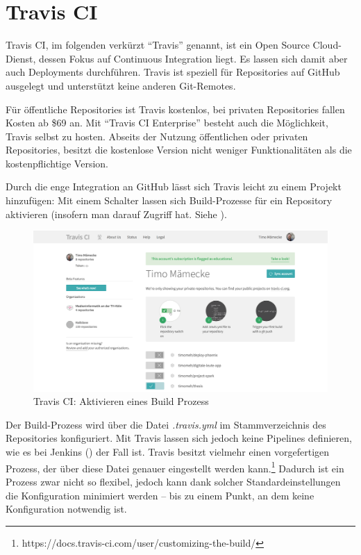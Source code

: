 \section{Travis CI}
\label{sec:analyse-travis}

Travis CI, im folgenden verkürzt ``Travis'' genannt, ist ein Open Source Cloud-Dienst, dessen Fokus auf Continuous Integration liegt. Es lassen sich damit aber auch Deployments durchführen. Travis ist speziell für Repositories auf GitHub ausgelegt und unterstützt keine anderen Git-Remotes.

Für öffentliche Repositories ist Travis kostenlos, bei privaten Repositories fallen Kosten ab \$69 an. Mit ``Travis CI Enterprise'' besteht auch die Möglichkeit, Travis selbst zu hosten. Abseits der Nutzung öffentlichen oder privaten Repositories, besitzt die kostenlose Version nicht weniger Funktionalitäten als die kostenpflichtige Version.

Durch die enge Integration an GitHub lässt sich Travis leicht zu einem Projekt hinzufügen: Mit einem Schalter lassen sich Build-Prozesse für ein Repository aktivieren (insofern man darauf Zugriff hat. Siehe ).

\begin{figure}[h]
  \caption{Travis CI: Aktivieren eines Build Prozess}
  \label{fig:travis-active}
  \includegraphics[width=.8\textwidth]{assets/travis-activate}
\end{figure}

Der Build-Prozess wird über die Datei \emph{.travis.yml} im Stammverzeichnis des Repositories konfiguriert. Mit Travis lassen sich jedoch keine Pipelines definieren, wie es bei Jenkins () der Fall ist. Travis besitzt vielmehr einen vorgefertigen Prozess, der über diese Datei genauer eingestellt werden kann.\footnote{https://docs.travis-ci.com/user/customizing-the-build/} Dadurch ist ein Prozess zwar nicht so flexibel, jedoch kann dank solcher Standardeinstellungen die Konfiguration minimiert werden – bis zu einem Punkt, an dem keine Konfiguration notwendig ist.

